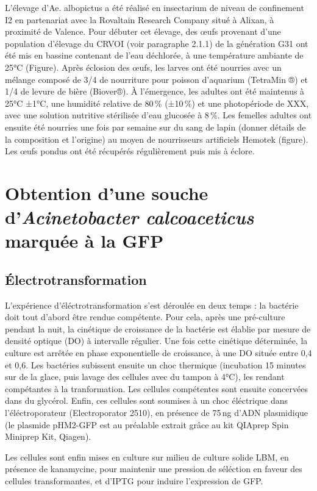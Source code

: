L’élevage d'Ae. albopictus a été réalisé en insectarium de niveau de confinement I2 en partenariat avec la Rovaltain Research Company situé à Alixan, à proximité de Valence. Pour débuter cet élevage, des œufs provenant d’une population d’élevage du CRVOI (voir paragraphe 2.1.1) de la génération G31 ont été mis en bassine contenant de l'eau déchlorée, à une température ambiante de 25°C (Figure). 
Après éclosion des œufs, les larves ont été nourries avec un mélange composé de 3/4 de nourriture pour poisson d'aquarium (TetraMin ®) et 1/4 de levure de bière (Biover®).
À l'émergence, les adultes ont été maintenus à 25°C ±1°C, une humidité relative de 80\,\% (±10\,\%) et une photopériode de XXX, avec une solution nutritive stérilisée d'eau glucosée à 8\,\%. Les femelles adultes ont ensuite été nourries une fois par semaine sur du sang de lapin (donner détails de la composition et l’origine) au moyen de nourrisseurs artificiels Hemotek (figure).
Les œufs pondus ont été récupérés régulièrement puis mis à éclore.

\section{Obtention d'une souche d'\textit{Acinetobacter calcoaceticus} marquée à la GFP}

\subsection{Électrotransformation}

L'expérience d'éléctrotransformation s'est déroulée en deux temps : la bactérie doit tout d'abord être rendue compétente.
Pour cela, après une pré-culture pendant la nuit, la cinétique de croissance de la bactérie est élablie par mesure de densité optique (DO) à intervalle régulier.
Une fois cette cinétique déterminée, la culture est arrêtée en phase exponentielle de croissance, à une DO située entre 0,4 et 0,6.
Les bactéries subissent ensuite un choc thermique (incubation 15 minutes sur de la glace, puis lavage des cellules avec du tampon à 4°C), les rendant compétantes à la tranformation.
Les cellules compétentes sont ensuite concervées dans du glycérol.
Enfin, ces cellules sont soumises à un choc éléctrique dans l'éléctroporateur (Electroporator 2510), en présence de 75\,ng d'ADN plasmidique (le plasmide pHM2-GFP est au préalable extrait grâce au kit QIAprep Spin Miniprep Kit, Qiagen).

Les cellules sont enfin mises en culture sur milieu de culture solide LBM, en présence de kanamycine, pour maintenir une pression de séléction en faveur des cellules transformantes, et d'IPTG pour induire l'expression de GFP.

